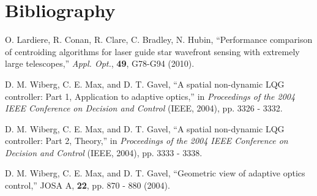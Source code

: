 
\newpage
\section{Bibliography}
\label{sec:biblio}

\begin{thebibliography}{}

O. Lardiere, R. Conan, R. Clare, C. Bradley, N. Hubin,
``Performance comparison of centroiding algorithms for laser guide star
wavefront sensing with extremely large telescopes,'' \emph{Appl. Opt.},
\textbf{49}, G78-G94 (2010).

D. M. Wiberg, C. E. Max, and D. T. Gavel, ``A spatial
non-dynamic LQG controller: Part 1, Application to
adaptive optics,'' in \emph{Proceedings of the 2004 IEEE
Conference on Decision and Control} (IEEE, 2004), pp.
3326 - 3332.

D. M. Wiberg, C. E. Max, and D. T. Gavel, ``A spatial
non-dynamic LQG controller: Part 2, Theory,'' in
\emph{Proceedings of the 2004 IEEE Conference on Decision and
Control} (IEEE, 2004), pp. 3333 - 3338.

D. M. Wiberg, C. E. Max, and D. T. Gavel, ``Geometric view of adaptive optics
control,'' JOSA A, \textbf{22}, pp. 870 - 880 (2004).

\end{thebibliography}
